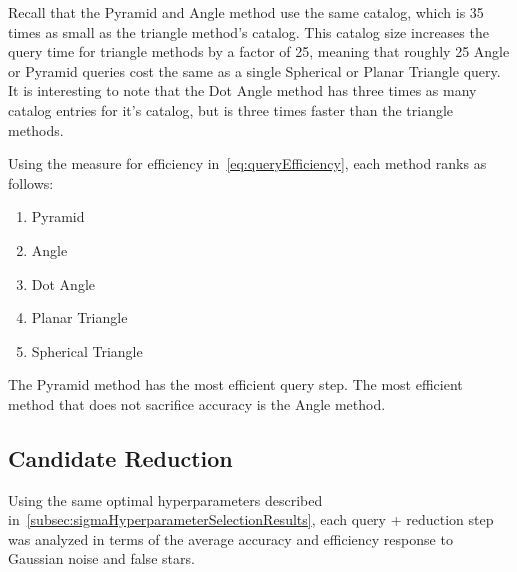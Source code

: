 Recall that the Pyramid and Angle method use the same catalog, which is 35 times as small as the triangle method's
catalog.
This catalog size increases the query time for triangle methods by a factor of 25, meaning that roughly 25 Angle or
Pyramid queries cost the same as a single Spherical or Planar Triangle query.
It is interesting to note that the Dot Angle method has three times as many catalog entries for it's catalog, but is
three times faster than the triangle methods.

Using the measure for efficiency in~\autoref{eq:queryEfficiency}, each method ranks as follows:
\begin{multicols}{2}
    \begin{enumerate}
        \item Pyramid
        \item Angle
        \item Dot Angle
        \item Planar Triangle
        \item Spherical Triangle
    \end{enumerate}
\end{multicols}

The Pyramid method has the most efficient query step.
The most efficient method that does not sacrifice accuracy is the Angle method.

\subsection{Candidate Reduction}\label{subsec:candidateReductionResults}
Using the same optimal hyperparameters described in~\autoref{subsec:sigmaHyperparameterSelectionResults}, each query +
reduction step was analyzed in terms of the average accuracy and efficiency response to Gaussian noise and false stars.

\begin{figure}
\end{figure}


